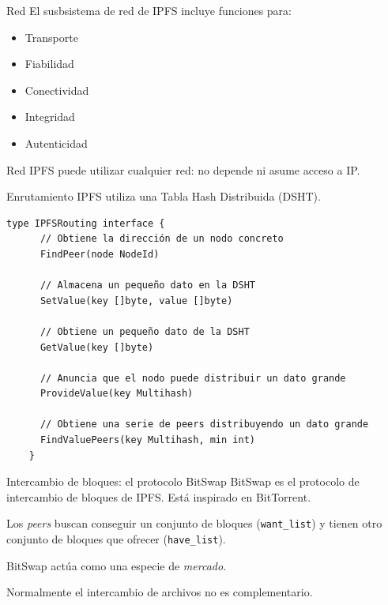 \documentclass[spanish]{beamer}
\begin{document}
\begin{frame}{Red}
  El susbsistema de red de IPFS incluye funciones para:
  \begin{itemize}
    \item Transporte
    \item Fiabilidad
    \item Conectividad
    \item Integridad
    \item Autenticidad
  \end{itemize}
\end{frame}

\begin{frame}{Red}
  IPFS puede utilizar cualquier red: no depende ni asume acceso a IP.
\end{frame}

\begin{frame}[fragile]{Enrutamiento}
  IPFS utiliza una Tabla Hash Distribuida (DSHT).

  \begin{lstlisting}[caption={Interfaz de la DSHT.}, language=Golang]
    type IPFSRouting interface {
      // Obtiene la dirección de un nodo concreto
      FindPeer(node NodeId)

      // Almacena un pequeño dato en la DSHT
      SetValue(key []byte, value []byte)

      // Obtiene un pequeño dato de la DSHT
      GetValue(key []byte)

      // Anuncia que el nodo puede distribuir un dato grande
      ProvideValue(key Multihash)

      // Obtiene una serie de peers distribuyendo un dato grande
      FindValuePeers(key Multihash, min int)
    }
  \end{lstlisting}
\end{frame}

\begin{frame}{Intercambio de bloques: el protocolo BitSwap}
  BitSwap es el protocolo de intercambio de bloques de IPFS. Está inspirado en BitTorrent.

  Los \textit{peers} buscan conseguir un conjunto de bloques (\texttt{want\_list}) y tienen otro conjunto de bloques que ofrecer (\texttt{have\_list}).

  BitSwap actúa como una especie de \textit{mercado}.

  Normalmente el intercambio de archivos no es complementario.
\end{frame}
\end{document}
